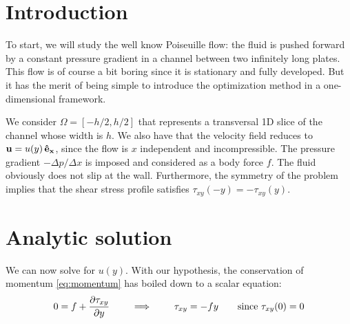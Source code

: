 \documentclass[11 pt]{report}
\begin{document}
\section{Introduction}
To start, we will study the well know Poiseuille flow: the fluid is pushed forward by a constant pressure gradient in a channel between two infinitely long plates. This flow is of course a bit boring since it is stationary and fully developed. But it has the merit of being simple to introduce the optimization method in a one-dimensional framework.

We consider $\Omega = [-h/2, h/2]$ that represents a transversal 1D slice of the channel whose width is $h$. We also have that the velocity field reduces to $\mathbf{u} = u(y)\,\mathbf{\hat{e}_x}$, since the flow is $x$ independent and incompressible. The pressure gradient $-\Delta p/\Delta x$ is imposed and considered as a body force $f$. The fluid obviously does not slip at the wall. Furthermore, the symmetry of the problem implies that the shear stress profile satisfies $\tau_{xy}(-y) = -\tau_{xy}(y)$.


\section{Analytic solution}
\label{sec:analytic1D}
We can now solve for $u(y)$. With our hypothesis, the conservation of momentum \eqref{eq:momentum} has boiled down to a scalar equation:
\begin{align}
    0 = f + \pdv{\tau_{xy}}{y} \qquad \implies \qquad \tau_{xy} = -f y \qquad \text{since } \tau_{xy}(0)=0
    \label{eq:tau_xy}
\end{align}
\end{document}
